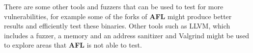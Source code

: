 \documentclass[../main.tex]{subfiles}
\begin{document}
There are some other tools and fuzzers that can be used to test for more
vulnerabilities, for example some of the forks of \textbf{AFL} might produce better results and efficiently test these binaries. Other tools such as LLVM, which includes a fuzzer, a memory and an address sanitizer and Valgrind might be used to explore areas that \textbf{AFL} is not able to test.
\end{document}
